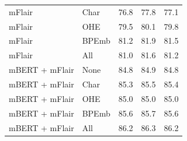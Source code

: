 \documentclass[12pt,a4paper,]{book}
\begin{document}
\begin{longtable}[t]{llrrr}
\hspace{1em}mFlair & Char & 76.8 & 77.8 & 77.1\\
\hspace{1em}mFlair & OHE & 79.5 & 80.1 & 79.8\\
\hspace{1em}mFlair & BPEmb & 81.2 & 81.9 & 81.5\\
\hspace{1em}mFlair & All & 81.0 & 81.6 & 81.2\\
\hspace{1em}mBERT + mFlair & None & 84.8 & 84.9 & 84.8\\
\hspace{1em}mBERT + mFlair & Char & 85.3 & 85.5 & 85.4\\
\hspace{1em}mBERT + mFlair & OHE & 85.0 & 85.0 & 85.0\\
\hspace{1em}mBERT + mFlair & BPEmb & 85.6 & 85.7 & 85.6\\
\hspace{1em}mBERT + mFlair & All & 86.2 & 86.3 & 86.2\\*
\end{longtable}
\endgroup{}

\newpage

\begingroup\fontsize{10}{12}\selectfont
\end{document}
